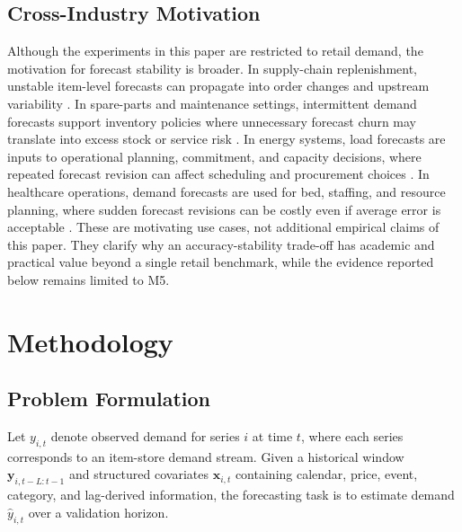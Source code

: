 \documentclass[10pt,conference]{IEEEtran}
\begin{document}
\subsection{Cross-Industry Motivation}
Although the experiments in this paper are restricted to retail demand, the motivation for forecast stability is broader. In supply-chain replenishment, unstable item-level forecasts can propagate into order changes and upstream variability \cite{lee1997bullwhip,chen2000bullwhip,zhang2004forecastingBullwhip}. In spare-parts and maintenance settings, intermittent demand forecasts support inventory policies where unnecessary forecast churn may translate into excess stock or service risk \cite{croston1972intermittent,syntetos2006stockControl}. In energy systems, load forecasts are inputs to operational planning, commitment, and capacity decisions, where repeated forecast revision can affect scheduling and procurement choices \cite{deCarolis2016loadForecasting}. In healthcare operations, demand forecasts are used for bed, staffing, and resource planning, where sudden forecast revisions can be costly even if average error is acceptable \cite{inpatientBed2022forecasting}. These are motivating use cases, not additional empirical claims of this paper. They clarify why an accuracy-stability trade-off has academic and practical value beyond a single retail benchmark, while the evidence reported below remains limited to M5.

\section{Methodology}
\subsection{Problem Formulation}
Let $y_{i,t}$ denote observed demand for series $i$ at time $t$, where each series corresponds to an item-store demand stream. Given a historical window $\mathbf{y}_{i,t-L:t-1}$ and structured covariates $\mathbf{x}_{i,t}$ containing calendar, price, event, category, and lag-derived information, the forecasting task is to estimate demand $\hat{y}_{i,t}$ over a validation horizon.
\end{document}
